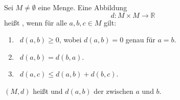 Sei $M \neq \emptyset$ eine Menge. Eine Abbildung 
$$d: M \times M \to \mathbb{R}$$
heißt , wenn für alle $a, b, c \in M$ gilt:
\begin{enumerate}[label="",leftmargin=*]
    \item {} \, $d(a, b) \geq 0$, wobei $d(a, b) = 0$ genau für $a=b$.
    \item {} \, $d(a, b) = d(b, a)$.
    \item {} \, $d(a, c) \leq d(a, b) + d(b, c)$.
\end{enumerate}
$(M, d)$ heißt  und $d(a, b)$ der  zwischen $a$ und $b$.